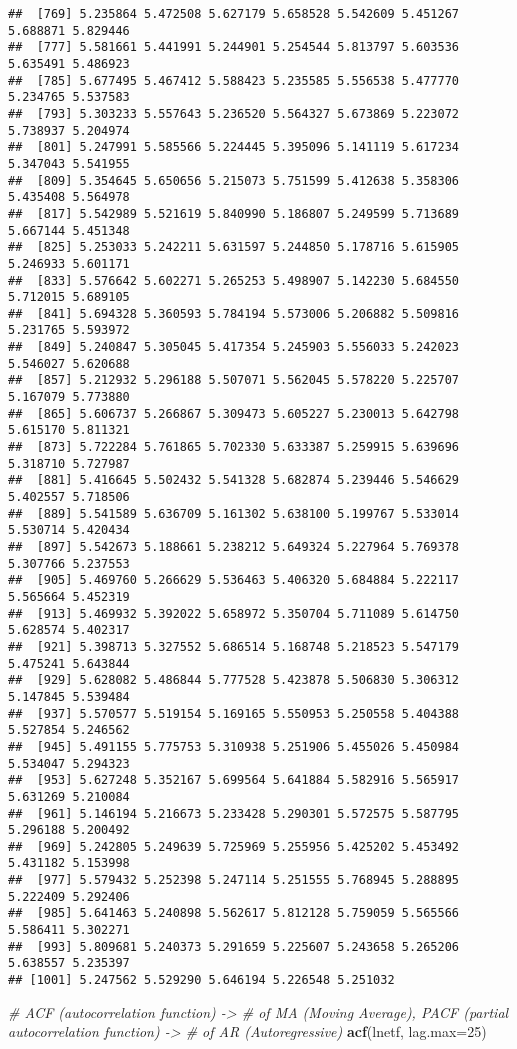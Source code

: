 \documentclass[
]{article}
\newenvironment{Shaded}{\begin{snugshade}}{\end{snugshade}}
\newcommand{\CommentTok}[1]{\textcolor[rgb]{0.56,0.35,0.01}{\textit{#1}}}
\newcommand{\DataTypeTok}[1]{\textcolor[rgb]{0.13,0.29,0.53}{#1}}
\newcommand{\DecValTok}[1]{\textcolor[rgb]{0.00,0.00,0.81}{#1}}
\newcommand{\KeywordTok}[1]{\textcolor[rgb]{0.13,0.29,0.53}{\textbf{#1}}}
\newcommand{\NormalTok}[1]{#1}
\begin{document}
\begin{verbatim}
##  [769] 5.235864 5.472508 5.627179 5.658528 5.542609 5.451267 5.688871 5.829446
##  [777] 5.581661 5.441991 5.244901 5.254544 5.813797 5.603536 5.635491 5.486923
##  [785] 5.677495 5.467412 5.588423 5.235585 5.556538 5.477770 5.234765 5.537583
##  [793] 5.303233 5.557643 5.236520 5.564327 5.673869 5.223072 5.738937 5.204974
##  [801] 5.247991 5.585566 5.224445 5.395096 5.141119 5.617234 5.347043 5.541955
##  [809] 5.354645 5.650656 5.215073 5.751599 5.412638 5.358306 5.435408 5.564978
##  [817] 5.542989 5.521619 5.840990 5.186807 5.249599 5.713689 5.667144 5.451348
##  [825] 5.253033 5.242211 5.631597 5.244850 5.178716 5.615905 5.246933 5.601171
##  [833] 5.576642 5.602271 5.265253 5.498907 5.142230 5.684550 5.712015 5.689105
##  [841] 5.694328 5.360593 5.784194 5.573006 5.206882 5.509816 5.231765 5.593972
##  [849] 5.240847 5.305045 5.417354 5.245903 5.556033 5.242023 5.546027 5.620688
##  [857] 5.212932 5.296188 5.507071 5.562045 5.578220 5.225707 5.167079 5.773880
##  [865] 5.606737 5.266867 5.309473 5.605227 5.230013 5.642798 5.615170 5.811321
##  [873] 5.722284 5.761865 5.702330 5.633387 5.259915 5.639696 5.318710 5.727987
##  [881] 5.416645 5.502432 5.541328 5.682874 5.239446 5.546629 5.402557 5.718506
##  [889] 5.541589 5.636709 5.161302 5.638100 5.199767 5.533014 5.530714 5.420434
##  [897] 5.542673 5.188661 5.238212 5.649324 5.227964 5.769378 5.307766 5.237553
##  [905] 5.469760 5.266629 5.536463 5.406320 5.684884 5.222117 5.565664 5.452319
##  [913] 5.469932 5.392022 5.658972 5.350704 5.711089 5.614750 5.628574 5.402317
##  [921] 5.398713 5.327552 5.686514 5.168748 5.218523 5.547179 5.475241 5.643844
##  [929] 5.628082 5.486844 5.777528 5.423878 5.506830 5.306312 5.147845 5.539484
##  [937] 5.570577 5.519154 5.169165 5.550953 5.250558 5.404388 5.527854 5.246562
##  [945] 5.491155 5.775753 5.310938 5.251906 5.455026 5.450984 5.534047 5.294323
##  [953] 5.627248 5.352167 5.699564 5.641884 5.582916 5.565917 5.631269 5.210084
##  [961] 5.146194 5.216673 5.233428 5.290301 5.572575 5.587795 5.296188 5.200492
##  [969] 5.242805 5.249639 5.725969 5.255956 5.425202 5.453492 5.431182 5.153998
##  [977] 5.579432 5.252398 5.247114 5.251555 5.768945 5.288895 5.222409 5.292406
##  [985] 5.641463 5.240898 5.562617 5.812128 5.759059 5.565566 5.586411 5.302271
##  [993] 5.809681 5.240373 5.291659 5.225607 5.243658 5.265206 5.638557 5.235397
## [1001] 5.247562 5.529290 5.646194 5.226548 5.251032
\end{verbatim}

\begin{Shaded}
\begin{Highlighting}[]
  \CommentTok{# ACF (autocorrelation function) -> # of MA (Moving Average), PACF (partial autocorrelation function) -> # of AR (Autoregressive)}
    \KeywordTok{acf}\NormalTok{(lnetf, }\DataTypeTok{lag.max=}\DecValTok{25}\NormalTok{)}
\end{Highlighting}
\end{Shaded}
\end{document}
